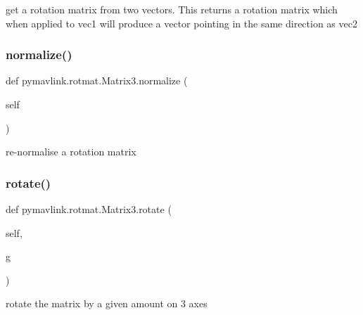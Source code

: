 \begin{DoxyVerb}get a rotation matrix from two vectors.
   This returns a rotation matrix which when applied to vec1
   will produce a vector pointing in the same direction as vec2\end{DoxyVerb}
 \mbox{\label{classpymavlink_1_1rotmat_1_1Matrix3_a8dcef0074eff59c72566574f380a8487}} 
\subsubsection{\texorpdfstring{normalize()}{normalize()}}
{\footnotesize\ttfamily def pymavlink.\+rotmat.\+Matrix3.\+normalize (\begin{DoxyParamCaption}\item[{}]{self }\end{DoxyParamCaption})}

\begin{DoxyVerb}re-normalise a rotation matrix\end{DoxyVerb}
 \mbox{\label{classpymavlink_1_1rotmat_1_1Matrix3_a68eaac6b40df4fda8589403cfb1c6f47}} 
\subsubsection{\texorpdfstring{rotate()}{rotate()}}
{\footnotesize\ttfamily def pymavlink.\+rotmat.\+Matrix3.\+rotate (\begin{DoxyParamCaption}\item[{}]{self,  }\item[{}]{g }\end{DoxyParamCaption})}

\begin{DoxyVerb}rotate the matrix by a given amount on 3 axes\end{DoxyVerb}
 \mbox{\label{classpymavlink_1_1rotmat_1_1Matrix3_a19396c2c390f18faf6701318dba6817a}} 
